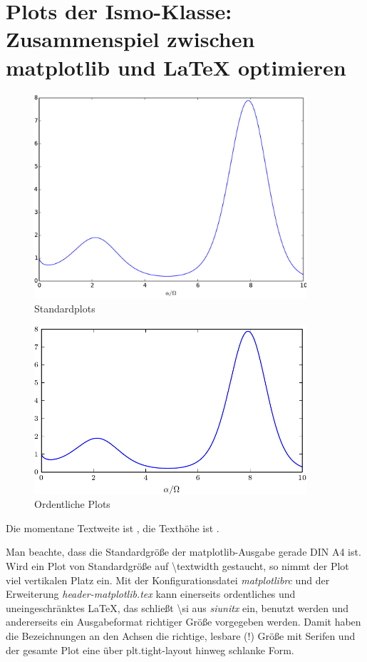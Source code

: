 \documentclass[parskip=half, titlepage=firstiscover, captions=tableheading,bibliography=totoc,]{scrartcl}
\begin{document}
\section{Plots der Ismo-Klasse: Zusammenspiel zwischen \texorpdfstring{\textsf{matplotlib}}{matplotlib} und \texorpdfstring{\LaTeX}{LaTeX} optimieren}
\begin{figure}[p]
	\centering
	\includegraphics[width=0.9\textwidth]{Pictures/plot_schlecht.pdf}
	\caption{Standardplots}
\end{figure}
\begin{figure}[p]
	\centering
	\includegraphics[width=0.9\textwidth]{Pictures/plot_gut.pdf}
	\caption{Ordentliche Plots}
\end{figure}

Die momentane Textweite ist \the\textwidth,
die Texthöhe ist \the\textheight.

Man beachte, dass die Standardgröße der \textsf{matplotlib}-Ausgabe gerade DIN A4 ist. 
Wird ein Plot von  Standardgröße auf \backslash \textsf{textwidth} gestaucht, so nimmt der Plot viel vertikalen Platz ein.
Mit der Konfigurationsdatei \emph{matplotlibrc} und der Erweiterung \emph{header-matplotlib.tex} kann einerseits ordentliches und uneingeschränktes \LaTeX, das schließt \backslash \textsf{si} aus \emph{siunitx} ein,  benutzt werden und
andererseits ein Ausgabeformat richtiger Größe vorgegeben werden.
Damit haben die Bezeichnungen an den Achsen die richtige, lesbare (!) Größe mit Serifen und der gesamte Plot eine über \textsf{plt.tight-layout} hinweg schlanke Form.
\end{document}

